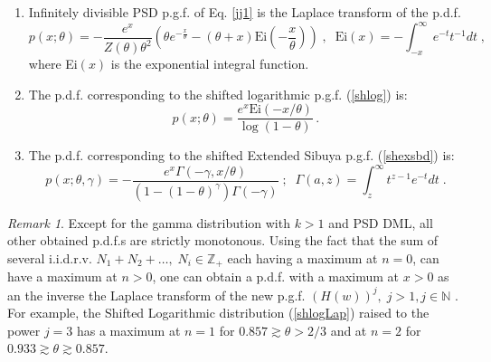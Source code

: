\documentclass[a4paper,12pt]{amsart}
\newcommand{\N}{\mathbb{N}}
\newcommand{\Z}{\mathbb{Z}_{+}}
\newcommand{\iid}{i.i.d.}
\theoremstyle{definition}
\theoremstyle{remark}
\newtheorem{Remark}{Remark}[section]
\begin{document}
\begin{enumerate}[label=(\roman*), leftmargin=*]
\item \label{recipr}
Infinitely divisible PSD p.g.f. of Eq. \ref{jj1} is the Laplace transform of the p.d.f.
\begin{equation}
    p(x;\theta) =-\frac{e^x}{Z(\theta)\theta^2} \left(\theta  e^{-\frac{x}{\theta }}-(\theta +x) \text{Ei}\left(-\frac{x}{\theta }\right)\right)\;, \;\; \text{Ei}(x)=-\int_{-x}^{\infty}e^{-t}t^{-1} dt\;, 
\end{equation}
where Ei$(x)$ is the exponential integral function. 
\item 
The p.d.f. corresponding to the shifted logarithmic p.g.f.  (\ref{shlog}) is:
\begin{equation}\label{shlogLap}
p(x;\theta)=\frac{e^x \text{Ei}\left(-x/\theta\right)}{\log (1-\theta )}\,.   
\end{equation}
\item \label{shexlap}
The p.d.f. corresponding to the shifted Extended Sibuya p.g.f. (\ref{shexsbd}) is:
\begin{equation}
p(x;\theta,\gamma)=-\frac{e^x \Gamma \left(-\gamma ,x/\theta\right)}{\left(1-(1-\theta )^{\gamma }\right) \Gamma (-\gamma )}\;;\;\;     \Gamma(a,z)=\int_z^{\infty}t^{z-1}e^{-t} dt\; .
\end{equation}

\end{enumerate} 
\begin{Remark}
Except for the gamma distribution with $k>1$ and PSD DML, all other obtained p.d.f.s are strictly monotonous. Using the fact that the sum of several \iid r.v. $N_1+N_2+\ldots,\; N_i \in \Z$ each having a maximum at $n=0$, can have a maximum at $n>0$, one can obtain a p.d.f. with a maximum at $x>0$ as an the inverse the Laplace transform of the new p.g.f. $(H(w))^j,\; j>1, j\in \N$ . For example, the Shifted Logarithmic distribution (\ref{shlogLap}) raised to the power $j=3$ has a maximum at $n=1$  for $0.857\gtrsim \theta>2/3$  and at $n=2$ for $0.933\gtrsim \theta\gtrsim 0.857$. 
\end{Remark}

\end{document}
